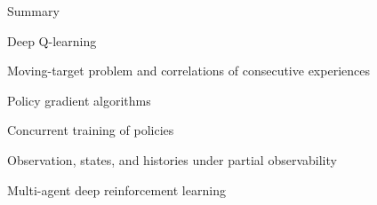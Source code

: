 %
%

\begin{frame}{Summary}

    \blist
        \item Deep Q-learning
        \item Moving-target problem and correlations of consecutive experiences
        \item Policy gradient algorithms
        \item Concurrent training of policies
        \item Observation, states, and histories under partial observability
    \elist


    \blist
        \item Multi-agent deep reinforcement learning 
    \elist
    
\end{frame}


